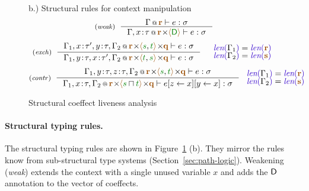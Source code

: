 \begin{figure}[t]
{\small b.) Structural rules for context manipulation}
\begin{equation*}
\tyrule{weak}
  {\coctx{\Gamma}{ \aclrd{\textbf{r}} } \vdash e : \sigma}
  {\coctx{\Gamma,x \!:\! \tau}{\aclrd{\textbf{r}} \cons \alift{ \cclrd{\ident{D}} }} \vdash e : \sigma} 
\end{equation*}
\begin{equation*}
\tyrule{exch}
  {\coctx{\Gamma_1,x\!:\!\tau',y\!:\!\tau,\Gamma_2}{\aclrd{\textbf{r}} \cons\alift{\cclrd{s},\cclrd{t}} \cons \aclrd{\textbf{q}}} \vdash e : \sigma}
  {\coctx{\Gamma_1,y\!:\!\tau,x\!:\!\tau',\Gamma_2}{\aclrd{\textbf{r}} \cons\alift{\cclrd{t},\cclrd{s}} \cons \aclrd{\textbf{q}}} \vdash e : \sigma}
\quad
\begin{array}{l}
\slen{\Gamma_1} = \slen{\aclrd{\textbf{r}}}\\[-0.25em]
\slen{\Gamma_2} = \slen{\aclrd{\textbf{s}}}
\end{array}
\end{equation*}
\begin{equation*}
\tyrule{contr}
  {\coctx{\Gamma_1,y\!:\!\tau,z\!:\!\tau,\Gamma_2}{\aclrd{\textbf{r}} \cons \alift{\cclrd{s},\cclrd{t}} \cons \aclrd{\textbf{q}}} \vdash e : \sigma}
  {\coctx{\Gamma_1,x\!:\!\tau,\Gamma_2}{\aclrd{\textbf{r}} \cons \alift{\cclrd{s}\sqcap\cclrd{t}} \cons \aclrd{\textbf{q}}} \vdash \subst{\subst{e}{z}{x}}{y}{x} : \sigma}
~
\begin{array}{l}
\slen{\Gamma_1} = \slen{\aclrd{\textbf{r}}}\\[-0.25em]
\slen{\Gamma_2} = \slen{\aclrd{\textbf{s}}}
\end{array}
\end{equation*}

\caption{Structural coeffect liveness analysis}
\label{fig:applications-struct-live}
\vspace{-1em}
\end{figure}


\paragraph{Structural typing rules.}
The structural typing rules are shown in Figure~\ref{fig:applications-struct-live} (b). They mirror
the rules know from sub-structural type systems (Section~\ref{sec:path-logic}). Weakening (\emph{weak})
extends the context with a single unused variable $x$ and adds the $\textnormal{\sffamily D}$ annotation to the
vector of coeffects.

